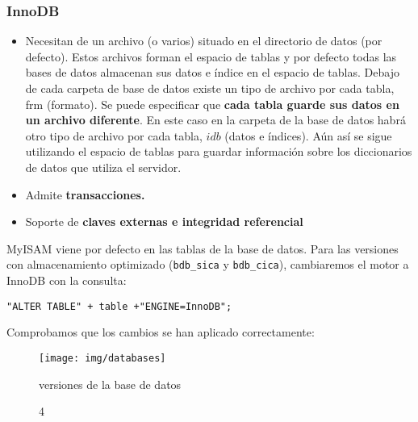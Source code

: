 \documentclass[12pt,a4paper]{article}
\begin{document}
\subsubsection{InnoDB} \label{pto312}
\begin{itemize}
\item Necesitan de un archivo (o varios) situado en el directorio de datos (por defecto). Estos archivos forman el espacio de tablas y por defecto todas las bases de datos almacenan sus datos e índice en el espacio de tablas. Debajo de cada carpeta de base de datos existe un tipo de archivo por cada tabla, frm (formato). Se puede especificar que \textbf{ cada tabla guarde sus datos en un archivo diferente}. En este caso en la carpeta de la base de datos habrá otro tipo de archivo por cada tabla, $idb$ (datos e índices). Aún así se sigue utilizando el espacio de tablas para guardar información sobre los diccionarios de datos que utiliza el servidor. 


\item Admite \textbf{transacciones.}

\item Soporte de \textbf{claves externas e integridad referencial}
\end{itemize}

MyISAM viene por defecto en las tablas de la base de datos. Para las versiones con almacenamiento optimizado (\verb|bdb_sica| y \verb|bdb_cica|), cambiaremos el motor a InnoDB con la consulta:

\verb|"ALTER TABLE" + table +"ENGINE=InnoDB";|



Comprobamos que los cambios se han aplicado correctamente:

\begin{figure}[!h]
\centering
\texttt{[image: img/databases]}
\caption 4 versiones de la base de datos 
\label{fig3}
\end{figure}
\end{document}
